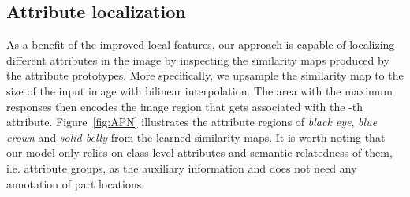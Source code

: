 \subsection{Attribute localization} 
\label{sec:Attri_loc}
As a benefit of the improved local features, our approach is capable of localizing different attributes in the image by inspecting the similarity maps produced by the attribute prototypes. 
More specifically, we upsample the similarity map  to the size of the input image with bilinear interpolation. The area with the maximum responses then encodes the image region that gets associated with the -th attribute.
Figure~\ref{fig:APN} illustrates the attribute regions of \textit{black eye}, \textit{blue crown} and \textit{solid belly} from the learned similarity maps. It is worth noting that our model only relies on class-level attributes and semantic relatedness of them, i.e. attribute groups, as the auxiliary information and does not need any annotation of part locations. 
 

 






\begin{table*}[t]
\setlength{\tabcolsep}{4pt}
\renewcommand{\arraystretch}{1.2}
\centering
{}
\caption{
}
\label{tab:ablation}
\end{table*}



